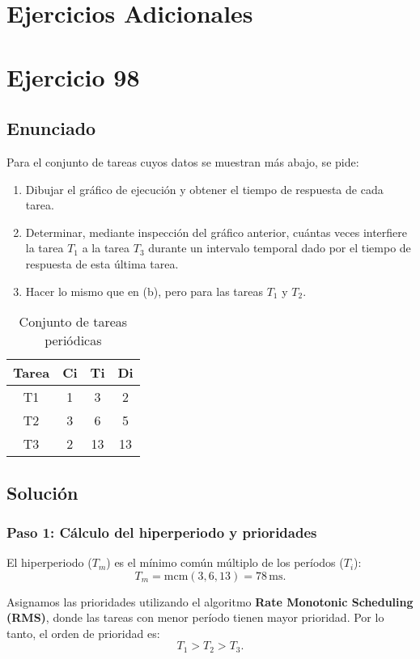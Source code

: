 \documentclass[a4paper,12pt]{article}
\begin{document}
\section*{Ejercicios Adicionales}

\section{Ejercicio 98}
\subsection{Enunciado}
Para el conjunto de tareas cuyos datos se muestran más abajo, se pide:
\begin{enumerate}
    \item Dibujar el gráfico de ejecución y obtener el tiempo de respuesta de cada tarea.
    \item Determinar, mediante inspección del gráfico anterior, cuántas veces interfiere la tarea \(T_1\) a la tarea \(T_3\) durante un intervalo temporal dado por el tiempo de respuesta de esta última tarea.
    \item Hacer lo mismo que en (b), pero para las tareas \(T_1\) y \(T_2\).
\end{enumerate}

\begin{table}[H]
\centering
\begin{tabular}{|c|c|c|c|}
\hline
\textbf{Tarea} & \textbf{Ci} & \textbf{Ti} & \textbf{Di} \\ \hline
T1 & 1 & 3 & 2 \\ \hline
T2 & 3 & 6 & 5 \\ \hline
T3 & 2 & 13 & 13 \\ \hline
\end{tabular}
\caption{Conjunto de tareas periódicas}
\end{table}

\subsection{Solución}
\subsubsection{Paso 1: Cálculo del hiperperiodo y prioridades}
El hiperperiodo (\(T_m\)) es el mínimo común múltiplo de los períodos (\(T_i\)):
\[
T_m = \text{mcm}(3, 6, 13) = 78 \, \text{ms}.
\]

Asignamos las prioridades utilizando el algoritmo \textbf{Rate Monotonic Scheduling (RMS)}, donde las tareas con menor período tienen mayor prioridad. Por lo tanto, el orden de prioridad es:
\[
T_1 > T_2 > T_3.
\]
\end{document}
